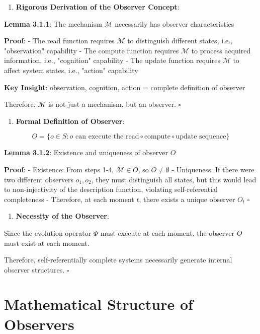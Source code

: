 \begin{enumerate}
\item \textbf{Rigorous Derivation of the Observer Concept}:
\end{enumerate}
   \textbf{Lemma 3.1.1}: The mechanism $\mathcal{M}$ necessarily has observer characteristics
\label{lemma:3.1.1}
   
   \textbf{Proof}:
   - The read function requires $\mathcal{M}$ to distinguish different states, i.e., "observation" capability
   - The compute function requires $\mathcal{M}$ to process acquired information, i.e., "cognition" capability
   - The update function requires $\mathcal{M}$ to affect system states, i.e., "action" capability
   
   \textbf{Key Insight}: observation, cognition, action = complete definition of observer
   
   Therefore, $\mathcal{M}$ is not just a mechanism, but an observer. $\square$

\begin{enumerate}
\item \textbf{Formal Definition of Observer}:
\end{enumerate}
   
\begin{equation}
O = \{o \in S: o \text{ can execute the } \text{read} \circ \text{compute} \circ \text{update} \text{ sequence}\}
\end{equation}

   \textbf{Lemma 3.1.2}: Existence and uniqueness of observer $O$
\label{lemma:3.1.2}
   
   \textbf{Proof}:
   - Existence: From steps 1-4, $\mathcal{M} \in O$, so $O \neq \emptyset$
   - Uniqueness: If there were two different observers $o_1, o_2$, they must distinguish all states, but this would lead to non-injectivity of the description function, violating self-referential completeness
   - Therefore, at each moment $t$, there exists a unique observer $O_t$ $\square$

\begin{enumerate}
\item \textbf{Necessity of the Observer}:
\end{enumerate}
   Since the evolution operator $\Phi$ must execute at each moment, the observer $O$ must exist at each moment.
   
   Therefore, self-referentially complete systems necessarily generate internal observer structures. $\square$

\section{Mathematical Structure of Observers}
\label{sec:ch03_quantum:mathematical-structure-of-observers}

